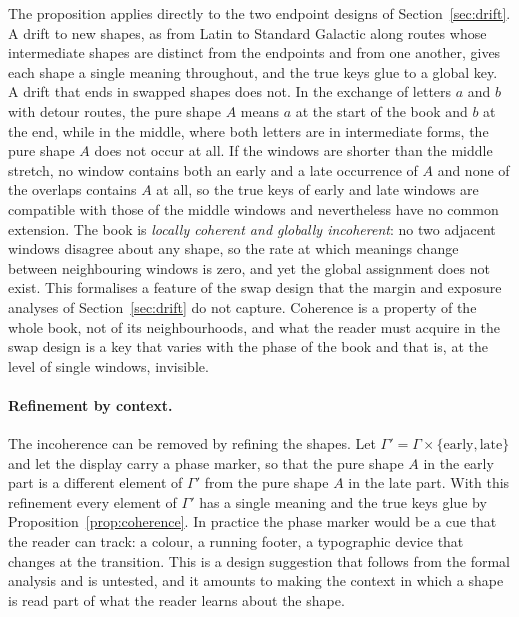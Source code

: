 The proposition applies directly to the two endpoint designs of Section~\ref{sec:drift}. A drift to new shapes, as from Latin to Standard Galactic along routes whose intermediate shapes are distinct from the endpoints and from one another, gives each shape a single meaning throughout, and the true keys glue to a global key. A drift that ends in swapped shapes does not. In the exchange of letters $a$ and $b$ with detour routes, the pure shape $A$ means $a$ at the start of the book and $b$ at the end, while in the middle, where both letters are in intermediate forms, the pure shape $A$ does not occur at all. If the windows are shorter than the middle stretch, no window contains both an early and a late occurrence of $A$ and none of the overlaps contains $A$ at all, so the true keys of early and late windows are compatible with those of the middle windows and nevertheless have no common extension. The book is \emph{locally coherent and globally incoherent}: no two adjacent windows disagree about any shape, so the rate at which meanings change between neighbouring windows is zero, and yet the global assignment does not exist. This formalises a feature of the swap design that the margin and exposure analyses of Section~\ref{sec:drift} do not capture. Coherence is a property of the whole book, not of its neighbourhoods, and what the reader must acquire in the swap design is a key that varies with the phase of the book and that is, at the level of single windows, invisible.

\paragraph{Refinement by context.}
The incoherence can be removed by refining the shapes. Let $\Gamma'=\Gamma\times\{\text{early},\text{late}\}$ and let the display carry a phase marker, so that the pure shape $A$ in the early part is a different element of $\Gamma'$ from the pure shape $A$ in the late part. With this refinement every element of $\Gamma'$ has a single meaning and the true keys glue by Proposition~\ref{prop:coherence}. In practice the phase marker would be a cue that the reader can track: a colour, a running footer, a typographic device that changes at the transition. This is a design suggestion that follows from the formal analysis and is untested, and it amounts to making the context in which a shape is read part of what the reader learns about the shape.

